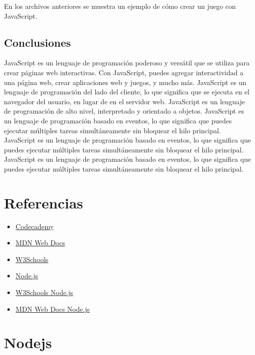 \documentclass[
  a4paper,
  DIV=11,
  numbers=noendperiod,
  onepage,
  openany]{scrreprt}
\providecommand{\tightlist}{%
  \setlength{\itemsep}{0pt}\setlength{\parskip}{0pt}}\usepackage{longtable,booktabs,array}
\begin{document}
\begin{tcolorbox}
En los archivos anteriores se muestra un ejemplo de cómo crear un juego
con JavaScript.

\section{Conclusiones}\label{conclusiones}

JavaScript es un lenguaje de programación poderoso y versátil que se
utiliza para crear páginas web interactivas. Con JavaScript, puedes
agregar interactividad a una página web, crear aplicaciones web y
juegos, y mucho más. JavaScript es un lenguaje de programación del lado
del cliente, lo que significa que se ejecuta en el navegador del
usuario, en lugar de en el servidor web. JavaScript es un lenguaje de
programación de alto nivel, interpretado y orientado a objetos.
JavaScript es un lenguaje de programación basado en eventos, lo que
significa que puedes ejecutar múltiples tareas simultáneamente sin
bloquear el hilo principal. JavaScript es un lenguaje de programación
basado en eventos, lo que significa que puedes ejecutar múltiples tareas
simultáneamente sin bloquear el hilo principal. JavaScript es un
lenguaje de programación basado en eventos, lo que significa que puedes
ejecutar múltiples tareas simultáneamente sin bloquear el hilo
principal.

\chapter{Referencias}\label{referencias-2}

\begin{itemize}
\tightlist
\item
  \href{https://www.codecademy.com/learn/introduction-to-javascript}{Codecademy}
\item
  \href{https://developer.mozilla.org/en-US/docs/Web/JavaScript}{MDN Web
  Docs}
\item
  \href{https://www.w3schools.com/js/default.asp}{W3Schools}
\item
  \href{https://nodejs.org/en/docs/}{Node.js}
\item
  \href{https://www.w3schools.com/nodejs/default.asp}{W3Schools Node.js}
\item
  \href{https://developer.mozilla.org/en-US/docs/Learn/Server-side/Nodejs}{MDN
  Web Docs Node.js}
\end{itemize}

\chapter{Nodejs}\label{nodejs}


\end{tcolorbox}
\end{document}
